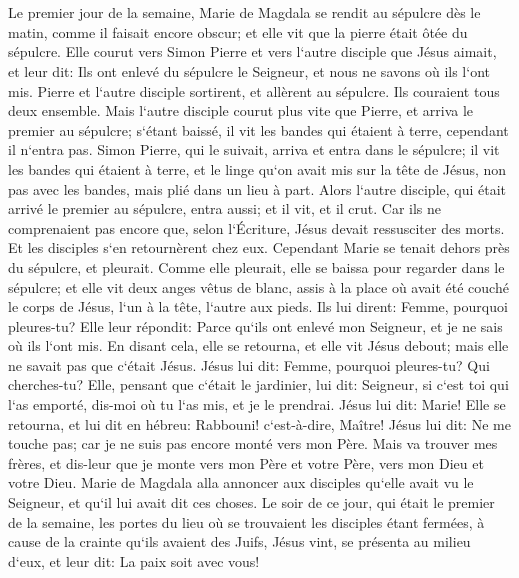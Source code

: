 \chapter{}

\verse Le premier jour de la semaine, Marie de Magdala se rendit au sépulcre dès le matin, comme il faisait encore obscur; et elle vit que la pierre était ôtée du sépulcre. 
\verse Elle courut vers Simon Pierre et vers l`autre disciple que Jésus aimait, et leur dit: Ils ont enlevé du sépulcre le Seigneur, et nous ne savons où ils l`ont mis. 
\verse Pierre et l`autre disciple sortirent, et allèrent au sépulcre. 
\verse Ils couraient tous deux ensemble. Mais l`autre disciple courut plus vite que Pierre, et arriva le premier au sépulcre; 
\verse s`étant baissé, il vit les bandes qui étaient à terre, cependant il n`entra pas. 
\verse Simon Pierre, qui le suivait, arriva et entra dans le sépulcre; il vit les bandes qui étaient à terre, 
\verse et le linge qu`on avait mis sur la tête de Jésus, non pas avec les bandes, mais plié dans un lieu à part. 
\verse Alors l`autre disciple, qui était arrivé le premier au sépulcre, entra aussi; et il vit, et il crut. 
\verse Car ils ne comprenaient pas encore que, selon l`Écriture, Jésus devait ressusciter des morts. 
\verse Et les disciples s`en retournèrent chez eux. 
\verse Cependant Marie se tenait dehors près du sépulcre, et pleurait. Comme elle pleurait, elle se baissa pour regarder dans le sépulcre; 
\verse et elle vit deux anges vêtus de blanc, assis à la place où avait été couché le corps de Jésus, l`un à la tête, l`autre aux pieds. 
\verse Ils lui dirent: Femme, pourquoi pleures-tu? Elle leur répondit: Parce qu`ils ont enlevé mon Seigneur, et je ne sais où ils l`ont mis. 
\verse En disant cela, elle se retourna, et elle vit Jésus debout; mais elle ne savait pas que c`était Jésus. 
\verse Jésus lui dit: Femme, pourquoi pleures-tu? Qui cherches-tu? Elle, pensant que c`était le jardinier, lui dit: Seigneur, si c`est toi qui l`as emporté, dis-moi où tu l`as mis, et je le prendrai. 
\verse Jésus lui dit: Marie! Elle se retourna, et lui dit en hébreu: Rabbouni! c`est-à-dire, Maître! 
\verse Jésus lui dit: Ne me touche pas; car je ne suis pas encore monté vers mon Père. Mais va trouver mes frères, et dis-leur que je monte vers mon Père et votre Père, vers mon Dieu et votre Dieu. 
\verse Marie de Magdala alla annoncer aux disciples qu`elle avait vu le Seigneur, et qu`il lui avait dit ces choses. 
\verse Le soir de ce jour, qui était le premier de la semaine, les portes du lieu où se trouvaient les disciples étant fermées, à cause de la crainte qu`ils avaient des Juifs, Jésus vint, se présenta au milieu d`eux, et leur dit: La paix soit avec vous! 
